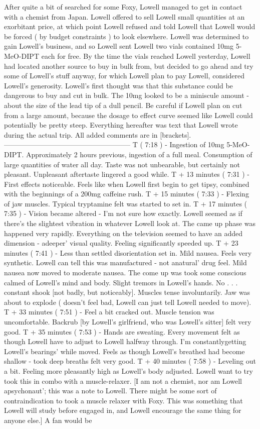 \documentclass[12pt]{book}
\begin{document}
After quite a bit of searched for some Foxy, Lowell managed to get in contact with a chemist from Japan. Lowell offered to sell Lowell small quantities at an exorbitant price, at which point Lowell refused and told Lowell that Lowell would be forced ( by budget constraints ) to look elsewhere. Lowell was determined to gain Lowell's business, and so Lowell sent Lowell two vials contained 10mg 5-MeO-DIPT each for free. By the time the vials reached Lowell yesterday, Lowell had located another source to buy in bulk from, but decided to go ahead and try some of Lowell's stuff anyway, for which Lowell plan to pay Lowell, considered Lowell's generosity. Lowell's first thought was that this substance could be dangerous to buy and cut in bulk. The 10mg looked to be a miniscule amount - about the size of the lead tip of a dull pencil. Be careful if Lowell plan on cut from a large amount, because the dosage to effect curve seemed like Lowell could potentially be pretty steep. Everything hereafter was text that Lowell wrote during the actual trip. All added comments are in [brackets]. ------------------------------------------------------ T ( 7:18 ) - Ingestion of 10mg 5-MeO-DIPT. Approximately 2 hours previous, ingestion of a full meal. Consumption of large quantities of water all day. Taste was not unbearable, but certainly not pleasant. Unpleasant aftertaste lingered a good while. T + 13 minutes ( 7:31 ) - First effects noticeable. Feels like when Lowell first begin to get tipsy, combined with the beginnings of a 200mg caffeine rush. T + 15 minutes ( 7:33 ) - Flexing of jaw muscles. Typical tryptamine felt was started to set in. T + 17 minutes ( 7:35 ) - Vision became altered - I'm not sure how exactly. Lowell seemed as if there's the slightest vibration in whatever Lowell look at. The came up phase was happened very rapidly. Everything on the television seemed to have an added dimension - adeeper' visual quality. Feeling significantly speeded up. T + 23 minutes ( 7:41 ) - Less than settled disorientation set in. Mild nausea. Feels very synthetic. Lowell can tell this was manufactured - not anatural' drug feel. Mild nausea now moved to moderate nausea. The come up was took some conscious calmed of Lowell's mind and body. Slight tremors in Lowell's hands. No . . .  constant shook [not badly, but noticeably]. Muscles tense involuntarily. Jaw was about to explode ( doesn't feel bad, Lowell can just tell Lowell needed to move). T + 33 minutes ( 7:51 ) - Feel a bit cracked out. Muscle tension was uncomfortable. Backrub [by Lowell's girlfriend, who was Lowell's sitter] felt very good. T + 35 minutes ( 7:53 ) - Hands are sweating. Every movement felt as though Lowell have to adjust to Lowell halfway through. I'm constantlygetting Lowell's bearings' while moved. Feels as though Lowell's breathed had become shallow - took deep breaths felt very good. T + 40 minutes ( 7:58 ) - Leveling out a bit. Feeling more pleasantly high as Lowell's body adjusted. Lowell want to try took this in combo with a muscle-relaxer. [I am not a chemist, nor am Lowell apsychonaut'; this was a note to Lowell. There might be some sort of contraindication to took a muscle relaxer with Foxy. This was something that Lowell will study before engaged in, and Lowell encourage the same thing for anyone else.] A fan would be 
\end{document}
